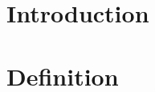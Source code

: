 \documentclass[twoside]{project}
\date{\today}
\begin{document}
\maketitle

\section*{Introduction}

\section*{Definition}


\section*{}


\section*{}


\section*{}


{}

\end{document}
